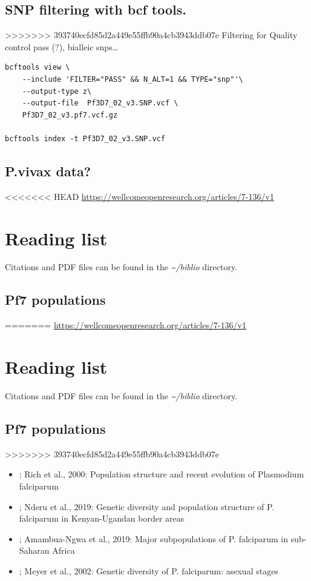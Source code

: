 \documentclass[11pt]{article}
\begin{document}
\subsection{SNP filtering with bcf tools.}
\label{sec:orga3336f3}
>>>>>>> 393740ecfd85d2a449e55ffb90a4cb3943ddb07e
Filtering for Quality control pass (?), bialleic snps\ldots{}

\begin{verbatim}
bcftools view \
    --include 'FILTER="PASS" && N_ALT=1 && TYPE="snp"'\
    --output-type z\
    --output-file  Pf3D7_02_v3.SNP.vcf \
    Pf3D7_02_v3.pf7.vcf.gz

bcftools index -t Pf3D7_02_v3.SNP.vcf
\end{verbatim}

\subsection{P.vivax data?}
<<<<<<< HEAD
\label{sec:org558637c}
\url{https://wellcomeopenresearch.org/articles/7-136/v1}

\section{Reading list}
\label{sec:org40fe19f}
Citations and PDF files can be found in the \emph{\textasciitilde{}/biblio} directory.
\subsection{Pf7 populations}
\label{sec:orgd5cbd97}
=======
\label{sec:org992a538}
\url{https://wellcomeopenresearch.org/articles/7-136/v1}

\section{Reading list}
\label{sec:org8d0bed9}
Citations and PDF files can be found in the \emph{\textasciitilde{}/biblio} directory.
\subsection{Pf7 populations}
\label{sec:org7cc5de0}
>>>>>>> 393740ecfd85d2a449e55ffb90a4cb3943ddb07e
\begin{itemize}
\item \cite{rich-2000-popul-struc}; Rich et al., 2000: Population structure and recent evolution of Plasmodium falciparum
\item \cite{nderu-2019-genet-diver}; Nderu et al., 2019: Genetic diversity and population structure of P. falciparum in Kenyan-Ugandan border areas
\item \cite{amambua-ngwa-2019-major-subpop}; Amambua-Ngwa et al., 2019: Major subpopulations of P. falciparum in sub-Saharan Africa
\item \cite{meyer-2002-review}; Meyer et al., 2002: Genetic diversity of P. falciparum: asexual stages
\end{itemize}
\end{document}
